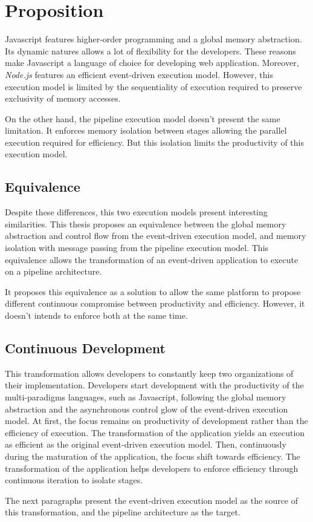 \section{Proposition} \label{chapter4:equivalence}

Javascript features higher-order programming and a global memory abstraction.
Its dynamic natures allows a lot of flexibility for the developers.
These reasons make Javascript a language of choice for developing web application.
Moreover, \textit{Node.js} features an efficient event-driven execution model.
However, this execution model is limited by the sequentiality of execution required to preserve exclusivity of memory accesses.

On the other hand, the pipeline execution model doesn't present the same limitation.
It enforces memory isolation between stages allowing the parallel execution required for efficiency.
But this isolation limits the productivity of this execution model.

\subsection{Equivalence}

Despite these differences, this two execution models present interesting similarities.
This thesis proposes an equivalence between the global memory abstraction and control flow from the event-driven execution model, and memory isolation with message passing from the pipeline execution model.
This equivalence allows the transformation of an event-driven application to execute on a pipeline architecture.

It proposes this equivalence as a solution to allow the same platform to propose different continuous compromise between productivity and efficiency.
However, it doesn't intends to enforce both at the same time.


\subsection{Continuous Development}


This transformation allows developers to constantly keep two organizations of their implementation. %
Developers start development with the productivity of the multi-paradigms languages, such as Javascript, following the global memory abstraction and the asynchronous control glow of the event-driven execution model.
At first, the focus remains on productivity of development rather than the efficiency of execution.
The transformation of the application yields an execution as efficient as the original event-driven execution model.
Then, continuously during the maturation of the application, the focus shift towards efficiency.
The transformation of the application helps developers to enforce efficiency through continuous iteration to isolate stages.

The next paragraphs present the event-driven execution model as the source of this transformation, and the pipeline architecture as the target.